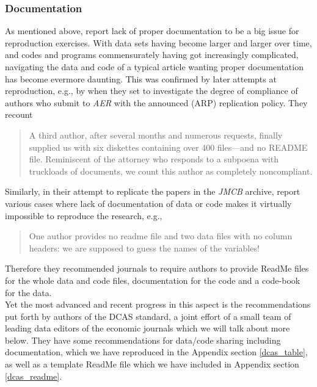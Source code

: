 \documentclass[11pt]{article}
\begin{document}
\subsubsection{Documentation}
As mentioned above, \cite{dewald1986replication} report lack of proper documentation to be a big issue for reproduction exercises. With data sets having become larger and larger over time, and codes and programs commensurately having got increasingly complicated, navigating the data and code of a typical article wanting proper documentation has become evermore daunting. This was confirmed by later attempts at reproduction, e.g., by \cite{mccullough2003verifying} when they set to investigate the degree of compliance of authors who submit to \textit{AER} with the announced (ARP) replication policy. They recount 
\begin{quotation}
A third author, after
several months and numerous requests, finally
supplied us with six diskettes containing over
400 files—and no README file. Reminiscent of the attorney who responds to a subpoena with
truckloads of documents, we count this author
as completely noncompliant.
\end{quotation}

Similarly, in their attempt to replicate the papers in the \textit{JMCB} archive, \cite{mccullough2006lessons} report various cases where lack of documentation of data or code makes it virtually impossible to reproduce the research, e.g.,
\begin{quotation}
One author provides no readme file and two data files with no column
headers: we are supposed to guess the names of the variables!
\end{quotation}
Therefore they recommended journals to require authors to provide ReadMe files for the whole data and code files, documentation for the code and a code-book for the data.\\

Yet the most advanced and recent progress in this aspect is the recommendations put forth by authors of the DCAS standard, a joint effort of a small team of leading data editors of the economic journals which we will talk about more below. They have some recommendations for data/code sharing including documentation, which we have reproduced in the Appendix section \ref{dcas_table}, as well as a template ReadMe file which we have included in Appendix section \ref{dcas_readme}.
\end{document}
